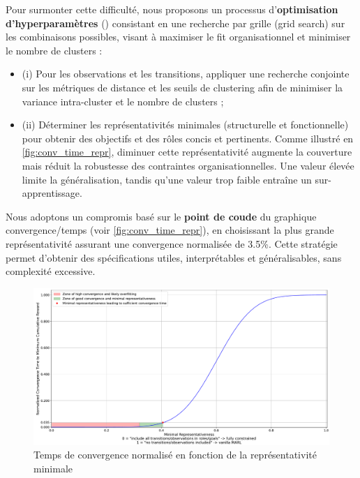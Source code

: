Pour surmonter cette difficulté, nous proposons un processus d'\textbf{optimisation d'hyperparamètres} () consistant en une recherche par grille (grid search) sur les combinaisons possibles, visant à maximiser le fit organisationnel et minimiser le nombre de clusters :

\begin{itemize}
    \item (i) Pour les observations et les transitions, appliquer une recherche conjointe sur les métriques de distance et les seuils de clustering afin de minimiser la variance intra-cluster et le nombre de clusters ;
    \item (ii) Déterminer les représentativités minimales (structurelle et fonctionnelle) pour obtenir des objectifs et des rôles concis et pertinents. Comme illustré en \autoref{fig:conv_time_repr}, diminuer cette représentativité augmente la couverture mais réduit la robustesse des contraintes organisationnelles. Une valeur élevée limite la généralisation, tandis qu'une valeur trop faible entraîne un sur-apprentissage.
\end{itemize}

Nous adoptons un compromis basé sur le \textbf{point de coude} du graphique convergence/temps (voir \autoref{fig:conv_time_repr}), en choisissant la plus grande représentativité assurant une convergence normalisée de 3.5\%. Cette stratégie permet d'obtenir des spécifications utiles, interprétables et généralisables, sans complexité excessive.

\begin{figure}[h!]
    \centering
    \includegraphics[trim=0cm 0cm 0cm 0cm, clip, width=1.\linewidth]{figures/convergence_time_relative_to_representativeness.pdf}
    \caption{Temps de convergence normalisé en fonction de la représentativité minimale}
    \label{fig:conv_time_repr}
\end{figure}


